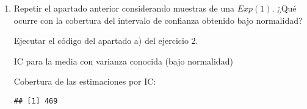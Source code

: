 \documentclass[
]{book}
\newenvironment{Shaded}{\begin{snugshade}}{\end{snugshade}}
\newcommand{\CommentTok}[1]{\textcolor[rgb]{0.56,0.35,0.01}{\textit{#1}}}
\newcommand{\DecValTok}[1]{\textcolor[rgb]{0.00,0.00,0.81}{#1}}
\newcommand{\FloatTok}[1]{\textcolor[rgb]{0.00,0.00,0.81}{#1}}
\newcommand{\KeywordTok}[1]{\textcolor[rgb]{0.13,0.29,0.53}{\textbf{#1}}}
\newcommand{\NormalTok}[1]{#1}
\newcommand{\OperatorTok}[1]{\textcolor[rgb]{0.81,0.36,0.00}{\textbf{#1}}}
\newcommand{\StringTok}[1]{\textcolor[rgb]{0.31,0.60,0.02}{#1}}
\theoremstyle{break}
\theoremstyle{definition}
\theoremstyle{definition}
\theoremstyle{definition}
\theoremstyle{remark}
\begin{document}
\vspace{0.5cm}

\begin{enumerate}
\def\labelenumi{\alph{enumi})}
\setcounter{enumi}{1}
\item
  Repetir el apartado anterior considerando muestras de una
  \(Exp(1)\). ¿Qué ocurre con la cobertura del intervalo de
  confianza obtenido bajo normalidad?

  Ejecutar el código del apartado a) del ejercicio 2.

  IC para la media con varianza conocida (bajo normalidad)

\begin{Shaded}
\end{Shaded}

  Cobertura de las estimaciones por IC:

\begin{Shaded}
\end{Shaded}

\begin{verbatim}
## [1] 469
\end{verbatim}


\end{enumerate}
\end{document}
